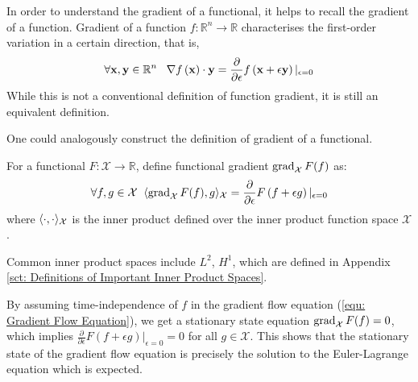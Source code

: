 \documentclass[../dissertation.tex]{subfiles}
\begin{document}
In order to understand the gradient of a functional, it helps to recall the gradient of a function.
Gradient of a function $f:\mathbb{R}^n \rightarrow \mathbb{R}$ characterises the first-order variation in a certain direction,
that is,
\begin{equation}
    \forall \mathbf{x}, \mathbf{y} \in \mathbb{R}^n \; \; \;
    \nabla f \left( \mathbf{x} \right) \cdot \mathbf{y} = \frac{\partial}{\partial \epsilon} f\left( \mathbf{x} + \epsilon \mathbf{y} \right)|_{\epsilon=0}
\end{equation}
While this is not a conventional definition of function gradient, it is still an equivalent definition.

One could analogously construct the definition of gradient of a functional.
\begin{definition}
    For a functional $F:\mathcal{X} \rightarrow \mathbb{R}$, define functional gradient $\operatorname{grad}_{\mathcal{X}} F (f)$ as:
    \begin{equation}
        \forall f, g \in \mathcal{X} \; \; \langle \operatorname{grad}_{\mathcal{X}} F (f), g \rangle_{\mathcal{X}} = \frac{\partial}{\partial \epsilon} F \left( f + \epsilon g \right)|_{\epsilon = 0}
    \end{equation}
    where $\langle \cdot, \cdot \rangle_{\mathcal{X}}$ is the inner product defined over the inner product function space $\mathcal{X}$.
\end{definition}

Common inner product spaces include $L^2$, $H^1$, which are defined in Appendix \ref{sct: Definitions of Important Inner Product Spaces}.

\begin{remark}
    By assuming time-independence of $f$ in the gradient flow equation (\ref{equ: Gradient Flow Equation}), we get a stationary state equation $\operatorname{grad}_{\mathcal{X}} F(f) = 0$,
    which implies $\frac{\partial}{\partial \epsilon} F \left( f + \epsilon g \right)|_{\epsilon=0} = 0$ for all $g \in \mathcal{X}$.
    This shows that the stationary state of the gradient flow equation is precisely the solution to the Euler-Lagrange equation which is expected.
\end{remark}
\end{document}
